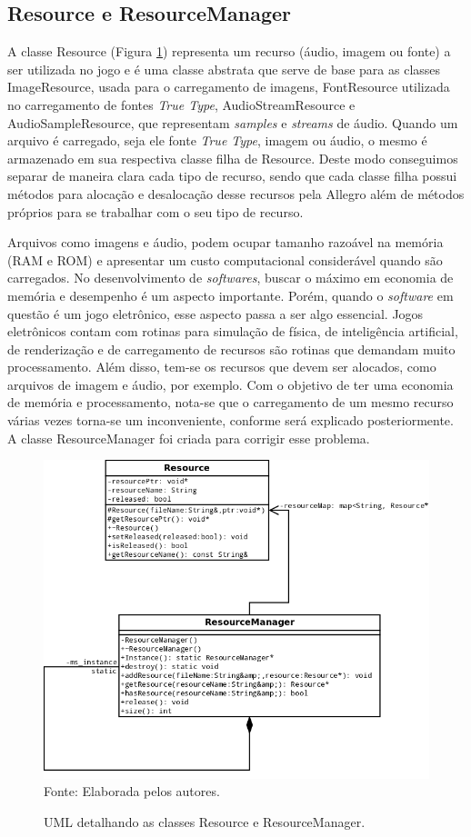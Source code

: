 \subsection{Resource e ResourceManager}
%
A classe Resource (Figura \ref{ResourceManager}) representa um recurso (áudio, imagem ou fonte) a ser utilizada no jogo e é uma classe abstrata que serve de base para as classes ImageResource, usada para o carregamento de imagens, FontResource utilizada no carregamento de fontes \textit{True Type}, AudioStreamResource e AudioSampleResource, que representam \textit{samples} e \textit{streams} de áudio. Quando um arquivo é carregado, seja ele fonte \textit{True Type}, imagem ou áudio, o mesmo é armazenado em sua respectiva classe filha de Resource. Deste modo conseguimos separar de maneira clara cada tipo de recurso, sendo que cada classe filha possui métodos para alocação e desalocação desse recursos pela Allegro além de métodos próprios para se trabalhar com o seu tipo de recurso. 
%
\par
Arquivos como imagens e áudio, podem ocupar tamanho razoável na memória (RAM e ROM) e apresentar um custo computacional considerável quando são carregados. No desenvolvimento de \textit{softwares}, buscar o máximo em economia de memória e desempenho é um aspecto importante. Porém, quando o \textit{software} em questão é um jogo eletrônico, esse aspecto passa a ser algo essencial. Jogos eletrônicos contam com rotinas para simulação de física, de inteligência artificial, de renderização e de carregamento de recursos são rotinas que demandam muito processamento. Além disso, tem-se os recursos que devem ser alocados, como arquivos de imagem e áudio, por exemplo. Com o objetivo de ter uma economia de memória e processamento, nota-se que o carregamento de um mesmo recurso várias vezes torna-se um inconveniente, conforme será explicado posteriormente. A classe ResourceManager foi criada para corrigir esse problema.
%
%
\begin{figure}[h]
    \centering
    \caption{UML detalhando as classes Resource e ResourceManager.}
    \label{ResourceManager}
    \includegraphics[scale = 0.4]{uml/ResourceManager.png}
    \\Fonte: Elaborada pelos autores.
\end{figure}
